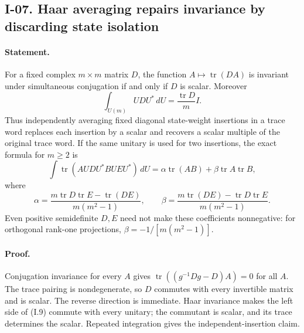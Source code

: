 \documentclass[11pt,a4paper]{article}
\theoremstyle{definition}\newtheorem{definition}{Definition}
\begin{document}
\subsection{I-07. Haar averaging repairs invariance by discarding state isolation}
\label{I-07}

\paragraph{Statement.}
For a fixed complex $m\times m$ matrix $D$, the function
$A\mapsto\operatorname{tr}(DA)$ is invariant under simultaneous
conjugation if and only if $D$ is scalar.  Moreover
\[
 \int_{U(m)}UDU^*\,dU=\frac{\operatorname{tr}D}{m}I.
\tag{I.9}
\]
Thus independently averaging fixed diagonal state-weight insertions
in a trace word replaces each insertion by a scalar and recovers
a scalar multiple of the original trace word.  If the same unitary
is used for two insertions, the exact formula for $m\ge2$ is
\[
 \int\operatorname{tr}(A UDU^* B UEU^*)\,dU
 =\alpha\operatorname{tr}(AB)+\beta\operatorname{tr}A\operatorname{tr}B,
\tag{I.10}
\]
where
\[
 \alpha=\frac{m\operatorname{tr}D\operatorname{tr}E-
                    \operatorname{tr}(DE)}{m(m^2-1)},\qquad
 \beta=\frac{m\operatorname{tr}(DE)-
                    \operatorname{tr}D\operatorname{tr}E}{m(m^2-1)}.
\]
Even positive semidefinite $D,E$ need not make these coefficients
nonnegative: for orthogonal rank-one projections,
$\beta=-1/[m(m^2-1)]$.

\paragraph{Proof.}
Conjugation invariance for every $A$ gives
$\operatorname{tr}((g^{-1}Dg-D)A)=0$ for all $A$.  The trace pairing
is nondegenerate, so $D$ commutes with every invertible matrix and
is scalar.  The reverse direction is immediate.  Haar invariance
makes the left side of (I.9) commute with every unitary; the
commutant is scalar, and its trace determines the scalar.  Repeated
integration gives the independent-insertion claim.
\end{document}
